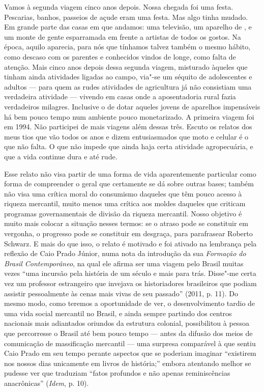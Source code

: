 Vamos à segunda viagem cinco anos depois. Nossa chegada foi uma festa.
Pescarias, banhos, passeios de açude eram uma festa. Mas algo tinha
mudado. Em grande parte das casas em que andamos: uma televisão, um
aparelho de , e um monte de gente esparramada em frente a artistas de
todos os gostos. Na época, aquilo aparecia, para nós que tínhamos talvez
também o mesmo hábito, como descaso com os parentes e conhecidos vindos
de longe, como falta de atenção. Mais cinco anos depois dessa segunda
viagem, misturado àqueles que tinham ainda atividades ligadas ao campo,
via"-se um séquito de adolescentes e adultos --- para quem as rudes
atividades de agricultura já não consistiam uma verdadeira atividade ---
vivendo em casas onde a aposentadoria rural fazia verdadeiros milagres.
Inclusive o de dotar aqueles jovens de aparelhos impensáveis há bem
pouco tempo num ambiente pouco monetarizado. A primeira viagem foi em
1994. Não participei de mais viagens além dessas três. Escuto os relatos
dos meus tios que vão todos os anos e dizem entusiasmados que moto e
celular é o que não falta. O que não impede que ainda haja certa
atividade agropecuária, e que a vida continue dura e até rude.

Esse relato não visa partir de uma forma de vida aparentemente
particular como forma de compreender o geral que certamente se dá sobre
outras bases; também não visa uma crítica moral do consumismo daqueles
que têm pouco acesso à riqueza mercantil, muito menos uma crítica aos
moldes daqueles que criticam programas governamentais de divisão da
riqueza mercantil. Nosso objetivo é muito mais colocar a situação nesses
termos: se o atraso pode se constituir em vergonha, o progresso pode se
constituir em desgraça, para parafrasear Roberto Schwarz. E mais do que
isso, o relato é motivado e foi ativado na lembrança pela reflexão de
Caio Prado Júnior, numa nota da introdução da sua \emph{Formação do
Brasil Contemporâneo}, na qual ele afirma ser uma viagem pelo Brasil
muitas vezes ``uma incursão pela história de um século e mais para trás.
Disse"-me certa vez um professor estrangeiro que invejava os
historiadores brasileiros que podiam assistir pessoalmente às cenas mais
vivas de seu passado'' (2011, p. 11). Do mesmo modo, como teremos a
oportunidade de ver, o desenvolvimento tardio de uma vida social
mercantil no Brasil, e ainda sempre partindo dos centros nacionais mais
adiantados oriundos da estrutura colonial, possibilitou à pessoa que
percorresse o Brasil até bem pouco tempo --- antes da difusão dos meios
de comunicação de massificação mercantil --- uma surpresa comparável à
que sentiu Caio Prado em seu tempo perante aspectos que se poderiam
imaginar ``existirem nos nossos dias unicamente em livros de história;''
embora atentando melhor se pudesse ver que traduziam ``fatos profundos e
não apenas reminiscências anacrônicas'' (\emph{Idem}, p. 10).

